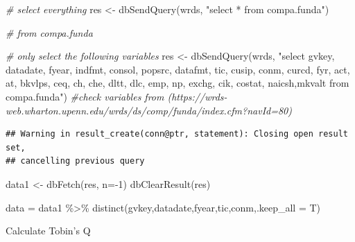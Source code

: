 \documentclass[
]{book}
\newenvironment{Shaded}{\begin{snugshade}}{\end{snugshade}}
\newcommand{\AttributeTok}[1]{\textcolor[rgb]{0.77,0.63,0.00}{#1}}
\newcommand{\CommentTok}[1]{\textcolor[rgb]{0.56,0.35,0.01}{\textit{#1}}}
\newcommand{\DecValTok}[1]{\textcolor[rgb]{0.00,0.00,0.81}{#1}}
\newcommand{\FunctionTok}[1]{\textcolor[rgb]{0.00,0.00,0.00}{#1}}
\newcommand{\NormalTok}[1]{#1}
\newcommand{\OtherTok}[1]{\textcolor[rgb]{0.56,0.35,0.01}{#1}}
\newcommand{\SpecialCharTok}[1]{\textcolor[rgb]{0.00,0.00,0.00}{#1}}
\newcommand{\StringTok}[1]{\textcolor[rgb]{0.31,0.60,0.02}{#1}}
\begin{document}
\begin{Shaded}
\begin{Highlighting}[]
\CommentTok{\# select everything}
\NormalTok{res }\OtherTok{\textless{}{-}} \FunctionTok{dbSendQuery}\NormalTok{(wrds, }\StringTok{"select * from compa.funda"}\NormalTok{)}

\CommentTok{\# from compa.funda}

\CommentTok{\# only select the following variables}
\NormalTok{res }\OtherTok{\textless{}{-}} \FunctionTok{dbSendQuery}\NormalTok{(wrds, }\StringTok{"select gvkey, datadate, fyear, indfmt, consol, popsrc, datafmt, tic, cusip, conm, curcd, fyr, act, at, bkvlps, ceq, ch, che, dltt, dlc, emp, np, exchg, cik, costat, naicsh,mkvalt from compa.funda"}\NormalTok{) }\CommentTok{\#check variables from (https://wrds{-}web.wharton.upenn.edu/wrds/ds/comp/funda/index.cfm?navId=80)}
\end{Highlighting}
\end{Shaded}

\begin{verbatim}
## Warning in result_create(conn@ptr, statement): Closing open result set,
## cancelling previous query
\end{verbatim}

\begin{Shaded}
\begin{Highlighting}[]
\NormalTok{data1 }\OtherTok{\textless{}{-}} \FunctionTok{dbFetch}\NormalTok{(res, }\AttributeTok{n=}\SpecialCharTok{{-}}\DecValTok{1}\NormalTok{)}
\FunctionTok{dbClearResult}\NormalTok{(res)}

\NormalTok{data }\OtherTok{=}\NormalTok{ data1 }\SpecialCharTok{\%\textgreater{}\%}
    \FunctionTok{distinct}\NormalTok{(gvkey,datadate,fyear,tic,conm,}\AttributeTok{.keep\_all =}\NormalTok{ T)}
\end{Highlighting}
\end{Shaded}

Calculate Tobin's Q
\end{document}
